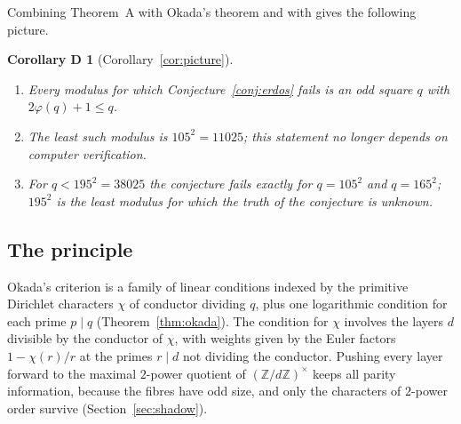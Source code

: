 \documentclass[11pt]{amsart}
\newtheorem*{mainD}{Corollary D}
\theoremstyle{definition}
\theoremstyle{remark}
\providecommand{\Z}{\mathbb Z}
\numberwithin{equation}{section}
\begin{document}
Combining Theorem~A with Okada's theorem and with \cite{Kei26} gives the following picture.

\begin{mainD}[Corollary~\ref{cor:picture}]
\begin{enumerate}
\item Every modulus for which Conjecture~\ref{conj:erdos} fails is an odd square $q$ with $2\varphi(q)+1\le q$.
\item The least such modulus is $105^2=11025$; this statement no longer depends on computer verification.
\item For $q<195^2=38025$ the conjecture fails exactly for $q=105^2$ and $q=165^2$; $195^2$ is the least modulus for which the truth of the conjecture is unknown.
\end{enumerate}
\end{mainD}

\subsection{The principle}
Okada's criterion is a family of linear conditions indexed by the primitive Dirichlet characters $\chi$ of conductor dividing $q$, plus one logarithmic condition for each prime $p\mid q$ (Theorem~\ref{thm:okada}).
The condition for $\chi$ involves the layers $d$ divisible by the conductor of $\chi$, with weights given by the Euler factors $1-\chi(r)/r$ at the primes $r\mid d$ not dividing the conductor.
Pushing every layer forward to the maximal $2$-power quotient of $(\Z/d\Z)^\times$ keeps all parity information, because the fibres have odd size, and only the characters of $2$-power order survive (Section~\ref{sec:shadow}).
\end{document}
